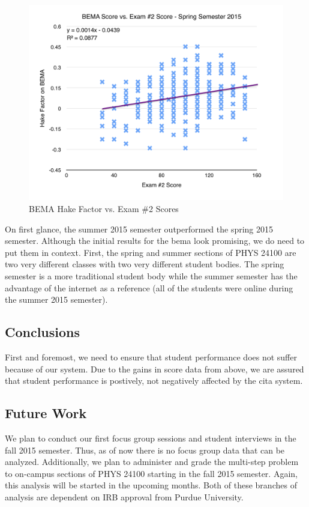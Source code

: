 \begin{figure}[!htb]
	\centering
	\includegraphics[width=6in]{img/chapter4/bema_vs_ex2_sp15}
	\caption[BEMA Hake Factor vs. Exam \#2 Scores]{BEMA Hake Factor vs. Exam \#2 Scores}
  \label{fig:bemaVsExTwoSp15}
\end{figure}

On first glance, the summer 2015 semester outperformed the spring 2015 semester. Although the initial results for the \gls{bema} look promising, we do need to put them in context. First, the spring and summer sections of PHYS 24100 are two very different classes with two very different student bodies. The spring semester is a more traditional student body while the summer semester has the advantage of the internet as a reference (all of the students were online during the summer 2015 semester).

\subsection{Conclusions}

First and foremost, we need to ensure that student performance does not suffer because of our system. Due to the gains in score data from above, we are assured that student performance is postively, not negatively affected by the \gls{cita} system.

\subsection{Future Work}

We plan to conduct our first focus group sessions and student interviews in the fall 2015 semester. Thus, as of now there is no focus group data that can be analyzed. Additionally, we plan to administer and grade the multi-step problem to on-campus sections of PHYS 24100 starting in the fall 2015 semester. Again, this analysis will be started in the upcoming months. Both of these branches of analysis are dependent on IRB approval from Purdue University.

